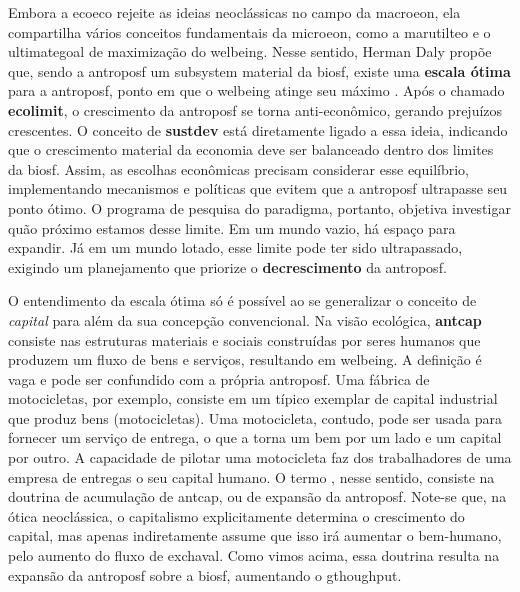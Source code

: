\documentclass[./main.tex]{subfiles}
\begin{document}
\par Embora a \gls{ecoeco} rejeite as ideias neoclássicas no campo da \gls{macroeon}, ela compartilha vários conceitos fundamentais da \gls{microeon}, como a \gls{marutilteo} e o \gls{ultimategoal} de maximização do \gls{welbeing}. Nesse sentido, Herman Daly propõe que, sendo a \gls{antroposf} um sub\gls{system} material da \gls{biosf}, existe uma \textbf{escala ótima} para a \gls{antroposf}, ponto em que o \gls{welbeing} atinge seu máximo \cite{Daly2015a}. Após o chamado \textbf{\gls{ecolimit}}, o crescimento da \gls{antroposf} se torna anti-econômico, gerando prejuízos crescentes. O conceito de \textbf{\gls{sustdev}} está diretamente ligado a essa ideia, indicando que o crescimento material da economia deve ser balanceado dentro dos limites da \gls{biosf}. Assim, as escolhas econômicas precisam considerar esse equilíbrio, implementando mecanismos e políticas que evitem que a \gls{antroposf} ultrapasse seu ponto ótimo. O programa de pesquisa do \gls{paradigma}, portanto, objetiva investigar quão próximo estamos desse limite. Em um mundo vazio, há espaço para expandir. Já em um mundo lotado, esse limite pode ter sido ultrapassado, exigindo um planejamento que priorize o \textbf{decrescimento} da \gls{antroposf}.

\par O entendimento da escala ótima só é possível ao se generalizar o conceito de \textit{capital} para além da sua concepção convencional. Na visão ecológica, \textbf{\gls{antcap}} consiste nas estruturas materiais e sociais construídas por seres humanos que produzem um fluxo de bens e serviços, resultando em \gls{welbeing}. A definição é vaga e pode ser confundido com a própria \gls{antroposf}. Uma fábrica de motocicletas, por exemplo, consiste em um típico exemplar de capital industrial que produz bens (motocicletas). Uma motocicleta, contudo, pode ser usada para fornecer um serviço de entrega, o que a torna um bem por um lado e um capital por outro. A capacidade de pilotar uma motocicleta faz dos trabalhadores de uma empresa de entregas o seu capital humano. O termo , nesse sentido, consiste na doutrina de acumulação de \gls{antcap}, ou de expansão da \gls{antroposf}. Note-se que, na ótica neoclássica, o capitalismo explicitamente determina o crescimento do capital, mas apenas indiretamente assume que isso irá aumentar o bem-humano, pelo aumento do fluxo de \gls{exchaval}. Como vimos acima, essa doutrina resulta na expansão da \gls{antroposf} sobre a \gls{biosf}, aumentando o \gls{gthoughput}. 
\end{document}
